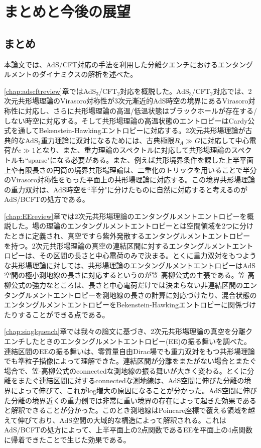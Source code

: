 \chapter{まとめと今後の展望}
\section*{まとめ}
本論文では、AdS/CFT対応の手法を利用した分離クエンチにおけるエンタングルメントのダイナミクスの解析を述べた。

\ref{chap:adscftreview}章ではAdS$_3$/CFT$_2$対応を概説した。AdS$_3$/CFT$_2$対応では、2次元共形場理論のVirasoro対称性が3次元漸近的AdS時空の境界にあるVirasoro対称性に対応し、さらに共形場理論の高温/低温状態はブラックホールが存在する/しない時空に対応する。そして共形場理論の高温状態のエントロピーはCardy公式を通してBekenstein-Hawkingエントロピーに対応する。2次元共形場理論が古典的なAdS$_3$重力理論に双対になるためには、古典極限$R_A\gg G$に対応して中心電荷が$c\gg 1$となり、また、重力理論のスペクトルに対応して共形場理論のスペクトルも``sparse"になる必要がある。また、例えば共形境界条件を課した上半平面上や有限長さの円筒の境界共形場理論は、二重化のトリックを用いることで半分のVirasoro対称性をもった平面上の共形場理論に対応する。この境界共形場理論の重力双対は、AdS時空を``半分"に分けたものに自然に対応すると考えるのがAdS/BCFTの処方である。

\ref{chap:EEreview}章では2次元共形場理論のエンタングルメントエントロピーを概説した。場の理論のエンタングルメントエントロピーとは空間領域を2つに分けたときに定義され、真空ですら紫外発散するエンタングルメントエントロピーを持つ。2次元共形場理論の真空の連結区間に対するエンタングルメントエントロピーは、その区間の長さと中心電荷のみで決まる。とくに重力双対をもつような共形場理論に対しては、共形場理論のエンタングルメントエントロピーはAdS空間の極小測地線の長さに対応するというのが笠-高柳公式の主張である。笠-高柳公式の強力なところは、長さと中心電荷だけでは決まらない非連結区間のエンタングルメントエントロピーを測地線の長さの計算に対応づけたり、混合状態のエンタングルメントエントロピーをBekenstein-Hawkingエントロピーに関係づけたりすることができる点である。

\ref{chap:singlquench}章では我々の論文\cite{Shimaji:2018czt}に基づき、2次元共形場理論の真空を分離クエンチしたときのエンタングルメントエントロピー(EE)の振る舞いを調べた。連結区間のEEの振る舞いは、零質量自由Dirac場でも重力双対をもつ共形場理論でも準粒子描像によって理解できた。連結区間が分離をまたがない場合とまたぐ場合で、笠-高柳公式のconnectedな測地線の振る舞いが大きく変わる。とくに分離をまたぐ連結区間に対するconnectedな測地線は、AdS空間に伸びた分離の境界によって伸びて、これがlog増大の原因になることが分かった。AdS空間に伸びた分離の境界近くの重力側では非常に重い境界の存在によって起きた効果であると解釈できることが分かった。このとき測地線はPoincare座標で覆える領域を越えて伸びており、AdS空間の大域的な構造によって解釈される。これはAdS/BCFTの処方によって、上半平面上の2点関数であるEEを平面上の4点関数に帰着できたことで生じた効果である。

